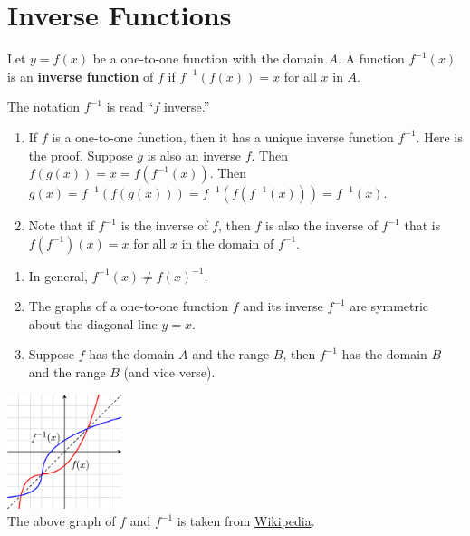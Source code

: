 \newpage

\section{Inverse Functions}

\begin{definition}
  Let $y=f(x)$ be a one-to-one function with the domain $A$. A function \(f^{-1}(x)\) is an \textbf{inverse function} of \(f\) if \(f^{-1}(f(x))=x\) for all \(x\) in $A$.

The notation \(f^{-1}\) is read “\(f\) inverse.” 
\end{definition}
\begin{remark}
  \begin{enumerate}[series=PropertiesInverse]
    \item If $f$ is a one-to-one function, then it has a unique inverse function $f^{-1}$. Here is the proof. Suppose $g$ is also an inverse $f$. Then $f(g(x))=x=f(f^{-1}(x))$. Then $g(x)=f^{-1}(f(g(x)))=f^{-1}(f(f^{-1}(x)))=f^{-1}(x)$.
    \item Note that if $f^{-1}$ is the inverse of $f$, then $f$ is also the inverse of $f^{-1}$ that is $f(f^{-1})(x)=x$ for all $x$ in the domain of $f^{-1}$.
  \end{enumerate}
  \begin{multicols}{2}
    \begin{enumerate}[resume=PropertiesInverse]
      \item In general, $f^{-1}(x)\neq f(x)^{-1}$.
      \item The graphs of a one-to-one function $f$ and its inverse $f^{-1}$ are symmetric about the diagonal line $y=x$.\\
      \item Suppose $f$ has the domain $A$ and the range $B$, then $f^{-1}$ has the domain $B$ and the range $B$ (and vice verse).
      \vfill\null
    \end{enumerate}
    \columnbreak
\begin{center}
  \includegraphics[width=0.25\textwidth]{figs/Inverse_Function_Graph.png}\\
 {\footnotesize The above graph of $f$ and $f^{-1}$ is taken from \href{https://en.wikipedia.org/wiki/Inverse_function}{Wikipedia}.}
\end{center}
\end{multicols}
\end{remark}

